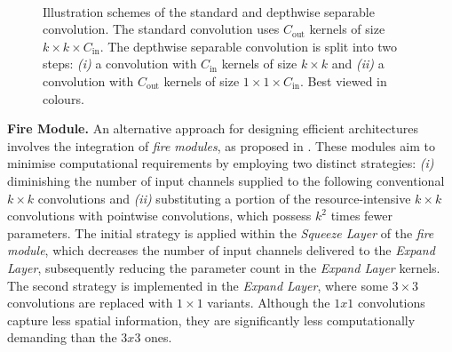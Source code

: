 \begin{figure}[htbp]
  \centering
  \\
  \vspace{1cm}
  \caption{Illustration schemes of the standard and depthwise separable
    convolution. The standard convolution uses $C_\text{out}$ kernels of size
    $k\times k \times C_\text{in}$. The depthwise separable convolution is
    split into two steps: \emph{(i)} a convolution with $C_\text{in}$ kernels
    of size $k \times k$ and \emph{(ii)} a convolution with $C_\text{out}$
    kernels of size $1\times 1 \times C_\text{in}$.
    Best viewed in colours.}
  \label{fig:sota:depthwise_conv_vs_standard_conv}
\end{figure}


\noindent \textbf{Fire Module.} An alternative approach for designing efficient
architectures involves the integration of \emph{fire modules}, as proposed in
\cite{DBLP:journals/corr/IandolaMAHDK16}. These modules aim to minimise
computational requirements by employing two distinct strategies: \emph{(i)}
diminishing the number of input channels supplied to the following conventional
$k\times k$ convolutions and \emph{(ii)} substituting a portion of the
resource-intensive $k\times k$ convolutions with pointwise convolutions, which
possess $k^2$ times fewer parameters. The initial strategy is applied within the
\emph{Squeeze Layer} of the \emph{fire module}, which decreases the number of
input channels delivered to the \emph{Expand Layer}, subsequently reducing the
parameter count in the \emph{Expand Layer} kernels. The second strategy is
implemented in the \emph{Expand Layer}, where some $3\times3$ convolutions are
replaced with $1\times1$ variants. Although the $1x1$ convolutions capture less
spatial information, they are significantly less computationally demanding than
the $3x3$ ones.\\

